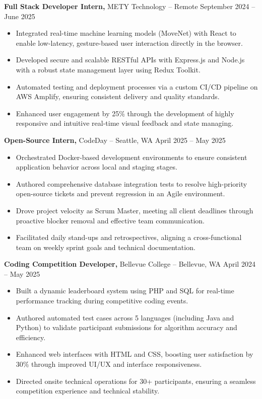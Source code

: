 \documentclass[11pt]{article}       %
\begin{document}
\textbf{Full Stack Developer Intern,} {METY Technology} -- Remote \hfill September 2024 -- June 2025 
\vspace{-9pt}
\begin{itemize}
  \item Integrated real-time machine learning models (MoveNet) with React to enable low-latency, gesture-based user interaction directly in the browser.
  \item Developed secure and scalable RESTful APIs with Express.js and Node.js with a robust state management layer using Redux Toolkit.
  \item Automated testing and deployment processes via a custom CI/CD pipeline on AWS Amplify, ensuring consistent delivery and quality standards.
  \item Enhanced user engagement by 25\% through the development of highly responsive and intuitive real-time visual feedback and state managing.
\end{itemize}

\textbf{Open-Source Intern,} {CodeDay} -- Seattle, WA \hfill April 2025 -- May 2025 \\
\vspace{-9pt}
\begin{itemize}
  \item Orchestrated Docker-based development environments to ensure consistent application behavior across local and staging stages.
  \item Authored comprehensive database integration tests to resolve high-priority open-source tickets and prevent regression in an Agile environment.
  \item Drove project velocity as Scrum Master, meeting all client deadlines through proactive blocker removal and effective team communication.
  \item Facilitated daily stand-ups and retrospectives, aligning a cross-functional team on weekly sprint goals and technical documentation.
\end{itemize}

\textbf{Coding Competition Developer,} {Bellevue College} -- Bellevue, WA \hfill April 2024 -- May 2025 \\
\vspace{-9pt}
\begin{itemize}
  \item Built a dynamic leaderboard system using PHP and SQL for real-time performance tracking during competitive coding events.
  \item Authored automated test cases across 5 languages (including Java and Python) to validate participant submissions for algorithm accuracy and efficiency.
  \item Enhanced web interfaces with HTML and CSS, boosting user satisfaction by 30\% through improved UI/UX and interface responsiveness.
  \item Directed onsite technical operations for 30+ participants, ensuring a seamless competition experience and technical stability.
\end{itemize}
\end{document}
